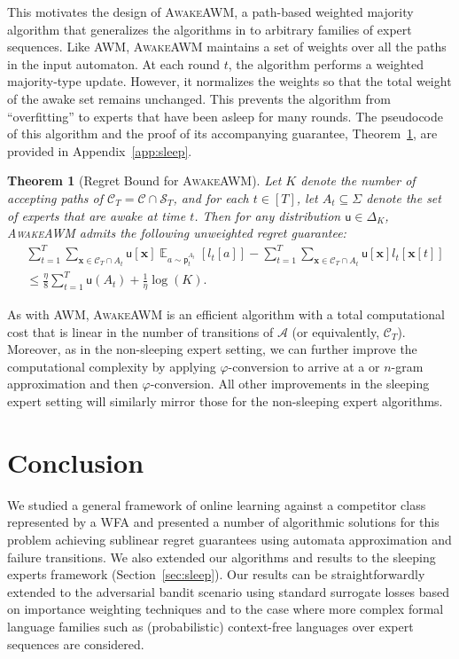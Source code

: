 \documentclass{article}
\DeclareMathOperator*{\E}{\mathbb E}
\newcommand{\sA}{\mathscr A}
\newcommand{\sC}{\mathscr C}
\newcommand{\sS}{\mathscr S}
\newcommand{\bx}{{\mathbf x}}
\newcommand{\sfp}{{\mathsf p}}
\newcommand{\sfu}{{\mathsf u}}
\renewcommand{\phi}{\varphi}
\newcommand{\ignore}[1]{}
\newcommand{\AWM}{\textsc{AWM}}
\newtheorem{theorem}{Theorem}
\begin{document}
This motivates the design of \textsc{AwakeAWM}, a 
path-based weighted majority algorithm that generalizes the algorithms
in \citep{FreundSchapireSingerWarmuth1997} to arbitrary families of
expert sequences.  Like \AWM, \textsc{AwakeAWM} maintains a set of
weights over all the paths in the input automaton. At each round $t$,
the algorithm performs a weighted majority-type update. However, it
normalizes the weights so that the total weight of the awake set
remains unchanged. This prevents the algorithm from ``overfitting'' to
experts that have been asleep for many rounds.  The pseudocode of this
algorithm and the proof of its accompanying guarantee,
Theorem~\ref{th:awakeawm}, 
are provided in Appendix~\ref{app:sleep}.

\begin{theorem}[Regret Bound for \textsc{AwakeAWM}]
  \label{th:awakeawm}
  Let $K$ denote the number of accepting paths of $\sC_T = \sC \cap \sS_T$,
  and for each $t \in [T]$, let $A_t\subseteq \Sigma$ denote the set of experts 
  that are awake at time $t$.
  Then for any distribution $\sfu\in \Delta_K$, \textsc{AwakeAWM} admits
  the following unweighted regret guarantee:
  \begin{align*}
    &\sum_{t = 1}^T \sum_{\bx \in \sC_T \cap A_t} \sfu[\bx] \E_{a \sim \sfp_t^{A_t}} [l_t[a]] - 
    \sum_{t=1}^T \sum_{\bx \in \sC_T \cap A_t} \sfu[\bx] l_t[\bx[t]] \\
    &\leq \frac{\eta}{8} \sum_{t = 1}^T \sfu(A_t) + \frac{1}{\eta} \log(K). 
  \end{align*}
\end{theorem}

As with \textsc{AWM}, \textsc{AwakeAWM} is an efficient algorithm
with a total computational cost that is linear in the number of transitions 
of $\sA$ (or equivalently, $\sC_T$). 
Moreover, as in the non-sleeping expert setting, we can further improve the
computational  complexity by applying $\phi$-conversion to arrive at a 
or $n$-gram approximation and then $\phi$-conversion.
All other improvements in the sleeping expert setting will similarly mirror
those for the non-sleeping expert algorithms.

\section{Conclusion}
\label{sec:conclusion}

We studied a general framework of online learning against a competitor
class represented by a WFA and presented a number of algorithmic
solutions for this problem achieving sublinear regret guarantees using
automata approximation and failure transitions.  We also extended our
algorithms and results to the sleeping experts framework
(Section~\ref{sec:sleep}).\ignore{and to the online convex optimization
setting (Appendix~\ref{app:oco}).}  Our results can be
straightforwardly extended to the adversarial bandit scenario using
standard surrogate losses based on importance weighting techniques and
to the case where more complex formal language families such as
(probabilistic) context-free languages over expert sequences are
considered.
\end{document}
